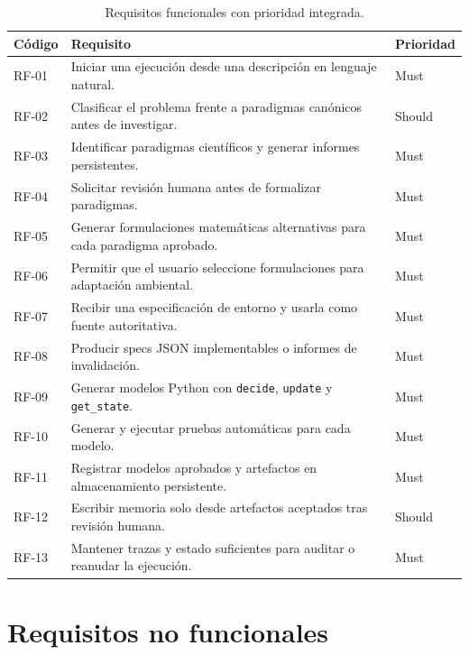 \begin{table}[H]
\begin{center}
\scriptsize
\begin{tabular}{|p{1.45cm}|p{9.5cm}|p{1.7cm}|} \hline
\textbf{Código} & \textbf{Requisito} & \textbf{Prioridad} \\ \hline
RF-01 & Iniciar una ejecución desde una descripción en lenguaje natural. & Must \\ \hline
RF-02 & Clasificar el problema frente a paradigmas canónicos antes de investigar. & Should \\ \hline
RF-03 & Identificar paradigmas científicos y generar informes persistentes. & Must \\ \hline
RF-04 & Solicitar revisión humana antes de formalizar paradigmas. & Must \\ \hline
RF-05 & Generar formulaciones matemáticas alternativas para cada paradigma aprobado. & Must \\ \hline
RF-06 & Permitir que el usuario seleccione formulaciones para adaptación ambiental. & Must \\ \hline
RF-07 & Recibir una especificación de entorno y usarla como fuente autoritativa. & Must \\ \hline
RF-08 & Producir specs JSON implementables o informes de invalidación. & Must \\ \hline
RF-09 & Generar modelos Python con \texttt{decide}, \texttt{update} y \texttt{get\_state}. & Must \\ \hline
RF-10 & Generar y ejecutar pruebas automáticas para cada modelo. & Must \\ \hline
RF-11 & Registrar modelos aprobados y artefactos en almacenamiento persistente. & Must \\ \hline
RF-12 & Escribir memoria solo desde artefactos aceptados tras revisión humana. & Should \\ \hline
RF-13 & Mantener trazas y estado suficientes para auditar o reanudar la ejecución. & Must \\ \hline
\end{tabular}
\caption{Requisitos funcionales con prioridad integrada.}
\end{center}
\end{table}

\section{Requisitos no funcionales}

